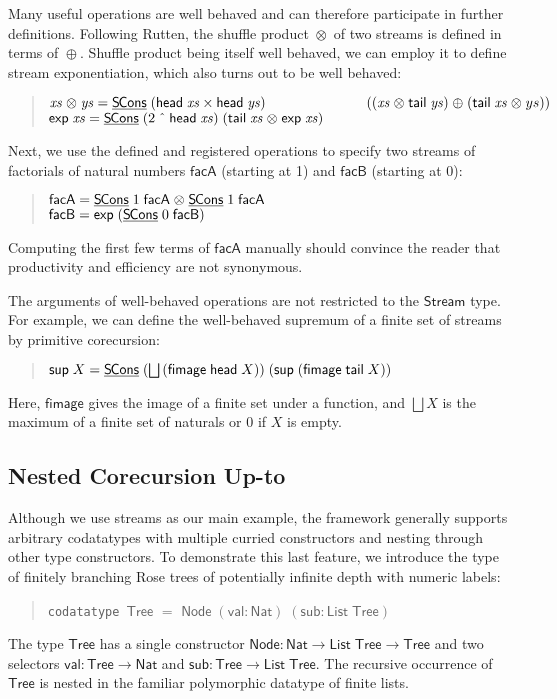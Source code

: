 \documentclass[preprint,draft]
{sigplanconf}
\newcommand\vthinspace{\kern.08333ex}
\newcommand\TC{\mathsf}
\newcommand\keyw[1]{\texttt{#1}}
\newcommand{\ra}{\rightarrow}
\newcommand{\<}{\langle}
\renewcommand{\>}{\rangle}
\newcommand{\Children}{{{\mathsf{sub}}}} \newcommand{\Label}{{{\mathsf{val}}}} \newcommand{\unf}{{{\mathsf{unf}}}}
\newcommand{\hd}{{{\mathsf{head}}}}
\newcommand{\tl}{{{\mathsf{tail}}}}
\newcommand{\SCons}{{{\mathsf{S\hspace*{-0.2ex}Cons}}}}
\newcommand{\Node}{{{\mathsf{Node}}}}
\newcommand{\opls}{\mathrel\oplus}
\newcommand{\oprd}{\mathrel\otimes}
\newcommand{\oexp}{{{\mathsf{exp}}}}
\newcommand{\facA}{{{\mathsf{facA}}}}
\newcommand{\facB}{{{\mathsf{facB}}}}
\newcommand{\SUP}{{{\mathsf{sup}}}}
\newcommand{\GUARD}[1]{{{\underline{#1}}}}
\newcommand{\fimage}{\mathsf{{fimage}}}
\newcommand{\xs}{{\mathit{xs}}}
\newcommand{\ys}{{\mathit{ys}}}
\newcommand\Stream{\TC{Stream}}
\newcommand\Nat{{\TC{Nat}}}
\newcommand{\List}{{\TC{List}}}
\newcommand{\Tree}{{\TC{Tree}}}
\begin{document}
Many useful operations are well behaved and can therefore participate in further
definitions.
Following Rutten, the shuffle product $\oprd$ of
two streams is defined in terms of $\opls$. Shuffle product
being itself well behaved, we can employ it to define stream exponentiation,
which also turns out to be well behaved:
\begin{quote}
$\xs \oprd \ys  =  \GUARD{\SCons}\;(\hd\;\xs \times \hd\;\ys)\;\\
 \phantom{\xs \oprd \ys  = \GUARD{\SCons}\;}((\xs \oprd \tl\;\ys) \opls (\tl\;\xs \oprd ys))$\\[1\jot]
$\oexp\;\xs  =  \GUARD{\SCons}\;(2 \mathbin{\vthinspace\char`\^\vthinspace} {\hd\;\xs})\;(\tl\;\xs \oprd \oexp\;\xs)$
\end{quote}
Next, we use the defined and registered operations to specify two streams of
factorials of natural numbers $\facA$ (starting at 1) and $\facB$ (starting
at 0):\begin{quote}
$\facA  =  \GUARD{\SCons}\;1\;\facA \oprd \GUARD{\SCons}\;1\;\facA$\\[1\jot]
$\facB  =  \oexp\;(\GUARD{\SCons}\;0\;\facB)$
\end{quote}
Computing the first few terms of $\facA$ manually should convince the reader
that productivity and efficiency are not synonymous.


The arguments of well-behaved operations are not restricted to the $\Stream$
type. For example, we can define the
well-behaved supremum of a finite set of streams by primitive corecursion:
\begin{quote}
$\SUP\;X= \GUARD{\SCons}\;({\bigsqcup}\,(\fimage\;\hd\;X))\;(\SUP\;(\fimage\;\tl\;X))$
\end{quote}
Here, $\fimage$ gives the image of a finite set under a function,
and $\bigsqcup X$ is the maximum of a finite set of naturals or $0$ if
$X$ is empty.



\subsection{Nested Corecursion Up-to}
\label{sec-nest-exa}

Although we use streams as our main example, the framework generally supports
arbitrary codatatypes with multiple curried constructors and nesting through
other type constructors. To demonstrate this last feature, we introduce the type of
finitely branching Rose trees of potentially infinite depth with numeric labels:
\begin{quote}
  \keyw{codatatype} \,$\Tree$ $=$ $\Node\;(\Label: \Nat)\;(\Children: \List\;\Tree)$
\end{quote}
The type $\Tree$ has a single constructor $\Node : \Nat \ra \List\;\Tree \ra
\Tree$ and two selectors $\Label : \Tree \ra \Nat$ and $\Children : \Tree \ra
\List\;\Tree$. The recursive occurrence of $\Tree$ is {nested} in the
familiar polymorphic datatype of finite lists.
\end{document}
